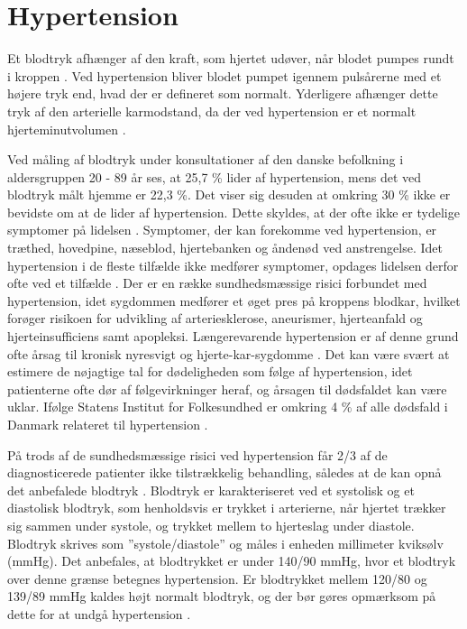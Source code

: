 \section{Hypertension} \label{sec:hypertension}

Et blodtryk afhænger af den kraft, som hjertet udøver, når blodet pumpes rundt i kroppen \citep{martini2015}. Ved hypertension bliver blodet pumpet igennem pulsårerne med et højere tryk end, hvad der er defineret som normalt. Yderligere afhænger dette tryk af den arterielle karmodstand, da der ved hypertension er et normalt hjerteminutvolumen \citep{olsen2015}. 
  
Ved måling af blodtryk under konsultationer af den danske befolkning i aldersgruppen 20 - 89 år ses, at 25,7 \% lider af hypertension, mens det ved blodtryk målt hjemme er 22,3 \%. Det viser sig desuden at omkring 30 \% ikke er bevidste om at de lider af hypertension. Dette skyldes, at der ofte ikke er tydelige symptomer på lidelsen \cite{kronborg2008}. Symptomer, der kan forekomme ved hypertension, er træthed, hovedpine, næseblod, hjertebanken og åndenød ved anstrengelse. Idet hypertension i de fleste tilfælde ikke medfører symptomer, opdages lidelsen derfor ofte ved et tilfælde \cite{olsen2015}.
Der er en række sundhedsmæssige risici forbundet med hypertension, idet sygdommen medfører et øget pres på kroppens blodkar, hvilket forøger risikoen for udvikling af arteriesklerose, aneurismer, hjerteanfald og hjerteinsufficiens samt apopleksi. Længerevarende hypertension er af denne grund ofte årsag til kronisk nyresvigt og hjerte-kar-sygdomme \cite{martini2015}. Det kan være svært at estimere de nøjagtige tal for dødeligheden som følge af hypertension, idet patienterne ofte dør af følgevirkninger heraf, og årsagen til dødsfaldet kan være uklar. Ifølge Statens Institut for Folkesundhed er omkring 4 \% af alle dødsfald i Danmark relateret til hypertension \cite{juel2006}.
 
På trods af de sundhedsmæssige risici ved hypertension får 2/3 af de diagnosticerede patienter ikke tilstrækkelig behandling, således at de kan opnå det anbefalede blodtryk \cite{paulsen2012}.
Blodtryk er karakteriseret ved et systolisk og et diastolisk blodtryk, som henholdsvis er trykket i arterierne, når hjertet trækker sig sammen under systole, og trykket mellem to hjerteslag under diastole. Blodtryk skrives som ”systole/diastole” og måles i enheden millimeter kviksølv (mmHg). Det anbefales, at blodtrykket er under 140/90 mmHg, hvor et blodtryk over denne grænse betegnes hypertension. Er blodtrykket mellem 120/80 og 139/89 mmHg kaldes højt normalt blodtryk, og der bør gøres opmærksom på dette for at undgå hypertension \cite{martini2015}.

